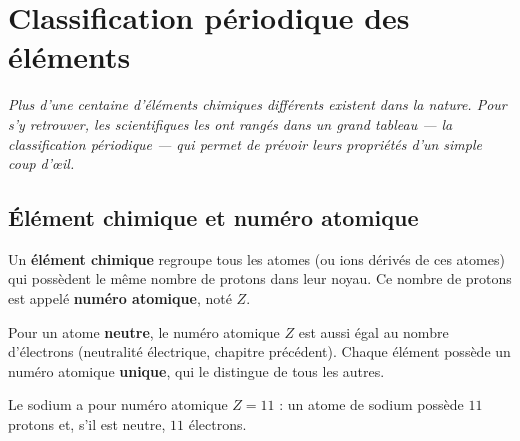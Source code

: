 \chapter{Classification périodique des éléments}

\noindent\textit{Plus d'une centaine d'éléments chimiques différents existent dans la
nature. Pour s'y retrouver, les scientifiques les ont rangés dans un grand tableau — la
classification périodique — qui permet de prévoir leurs propriétés d'un simple coup d'œil.}
\vspace{8pt}

\connecteBanner

\section{Élément chimique et numéro atomique}

\begin{definition}
Un \textbf{élément chimique} regroupe tous les atomes (ou ions dérivés de ces atomes) qui
possèdent le même nombre de protons dans leur noyau. Ce nombre de protons est appelé
\textbf{numéro atomique}, noté $Z$.
\end{definition}

\begin{propriete}
Pour un atome \textbf{neutre}, le numéro atomique $Z$ est aussi égal au nombre d'électrons
(neutralité électrique, chapitre précédent). Chaque élément possède un numéro atomique
\textbf{unique}, qui le distingue de tous les autres.
\end{propriete}

\begin{illus}
\end{illus}

\begin{exemple}
Le sodium a pour numéro atomique $Z=11$ : un atome de sodium possède $11$ protons et, s'il
est neutre, $11$ électrons.
\end{exemple}

